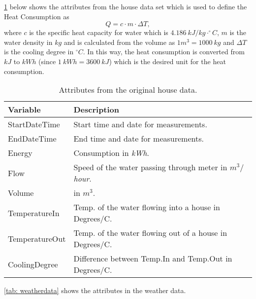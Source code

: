 \noindent \cref{tab: housedata} below shows the attributes from the house data set which is used to define the Heat Consumption as
\begin{equation}
    Q = c\cdot m \cdot \Delta T,
    \label{eq: Q_heat}
\end{equation}
where $c$ is the specific heat capacity for water which is $4.186 \ kJ/kg\cdot ^{\circ}C$, $m$ is the water density in $kg$ and is calculated from the volume as $1m^3 = 1000 \ kg$ and $\Delta T$ is the cooling degree in $^{\circ}C$. In this way, the heat consumption is converted from $kJ$ to $kWh$ (since $1 \ kWh = 3600 \ kJ$) which is the desired unit for the heat consumption. 
\begin{table}[H]
    \centering
    \begin{tabular}{ll}
     \hline
     \textbf{Variable} & \textbf{Description} \\
    \hline
    \hline
    StartDateTime  &  Start time and date for measurements.\\
    EndDateTime  &  End time and date for measurements.\\
    Energy  &  Consumption in \textit{kWh}.\\
    Flow  &  Speed of the water passing through meter in \textit{$m^3/$hour}.\\
    Volume & in $m^3$.\\
    TemperatureIn  &  Temp. of the water flowing into a house in Degrees/C. \\
    TemperatureOut  & Temp. of the water flowing out of a house in Degrees/C.\\
    CoolingDegree  &  Difference between Temp.In and Temp.Out in Degrees/C. \\
    \hline
    \end{tabular}
    \caption{Attributes from the original house data.}
    \label{tab: housedata}
\end{table}
\noindent \cref{tab: weatherdata} shows the attributes in the weather data.
